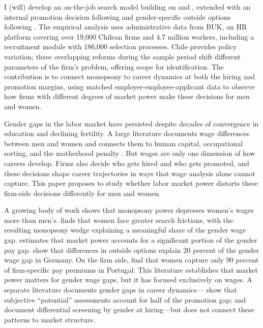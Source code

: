 \documentclass[11pt]{article}
\begin{document}
I (will) develop an on-the-job search model building on \citet{burdett_wage_1998} and \citet{postel-vinay_equilibrium_2002}, extended with an internal promotion decision following \citet{gibbons_theory_1999} and gender-specific outside options following \citet{sharma_monopsony_2023}. The empirical analysis uses administrative data from BUK, an HR platform covering over 19,000 Chilean firms and 4.7 million workers, including a recruitment module with 186,000 selection processes. Chile provides policy variation; three overlapping reforms during the sample period shift different parameters of the firm's problem, offering scope for identification. The contribution is to connect monopsony to career dynamics at both the hiring and promotion margins, using matched employer-employee-applicant data to observe how firms with different degrees of market power make these decisions for men and women.

\iffalse

Gender gaps in the labor market have persisted despite decades of convergence in education and declining fertility. A large literature documents wage differences between men and women and connects them to human capital, occupational sorting, and the motherhood penalty \citep{goldin_grand_2014, blau_gender_2017, kleven_children_2019}. But wages are only one dimension of how careers develop. Firms also decide who gets hired and who gets promoted, and these decisions shape career trajectories in ways that wage analysis alone cannot capture. This paper proposes to study whether labor market power distorts these firm-side decisions differently for men and women.

A growing body of work shows that monopsony power depresses women's wages more than men's. \citet{webber_firm-level_2016} finds that women face greater search frictions, with the resulting monopsony wedge explaining a meaningful share of the gender wage gap. \citet{sharma_monopsony_2023} estimates that market power accounts for a significant portion of the gender pay gap. \citet{caldwell_outside_nodate} show that differences in outside options explain 20 percent of the gender wage gap in Germany. On the firm side, \citet{card_bargaining_2016} find that women capture only 90 percent of firm-specific pay premiums in Portugal. This literature establishes that market power matters for gender wage gaps, but it has focused exclusively on wages. A separate literature documents gender gaps in career dynamics---\citet{benson_potential_2026} show that subjective ``potential'' assessments account for half of the promotion gap; \citet{bertrand_are_2004} and \citet{kline_systemic_2022} document differential screening by gender at hiring---but does not connect these patterns to market structure.
\end{document}
